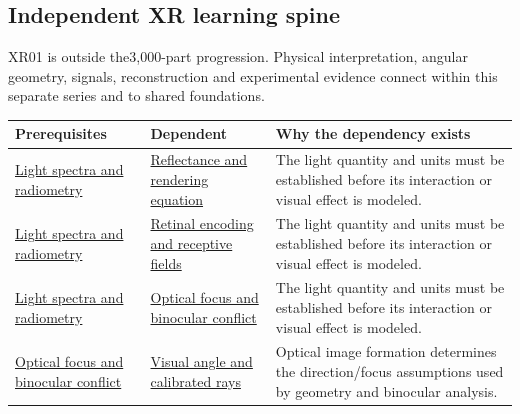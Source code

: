 \subsection{Independent XR learning spine}\label{appendix-4ad47bdd269a-independent-xr-learning-spine}

XR01 is outside the3,000-part progression. Physical interpretation, angular geometry, signals, reconstruction and experimental evidence connect within this separate series and to shared foundations.

{\def\LTcaptype{none} %
\begin{longtable}[]{@{}
  >{\raggedright\arraybackslash}p{}
  >{\raggedright\arraybackslash}p{}
  >{\raggedright\arraybackslash}p{}@{}}
\toprule\noalign{}
\begin{minipage}[b]{\linewidth}\raggedright
Prerequisites
\end{minipage} & \begin{minipage}[b]{\linewidth}\raggedright
Dependent
\end{minipage} & \begin{minipage}[b]{\linewidth}\raggedright
Why the dependency exists
\end{minipage} \\
\midrule\noalign{}
\endhead
\bottomrule\noalign{}
\endlastfoot
\hyperref[appendix-215c2570199b]{Light spectra and radiometry} & \hyperref[appendix-96da0b153b77]{Reflectance and rendering equation} & The light quantity and units must be established before its interaction or visual effect is modeled. \\
\hyperref[appendix-215c2570199b]{Light spectra and radiometry} & \hyperref[appendix-7281c15ac44a]{Retinal encoding and receptive fields} & The light quantity and units must be established before its interaction or visual effect is modeled. \\
\hyperref[appendix-215c2570199b]{Light spectra and radiometry} & \hyperref[appendix-f90cee1be7a4]{Optical focus and binocular conflict} & The light quantity and units must be established before its interaction or visual effect is modeled. \\
\hyperref[appendix-f90cee1be7a4]{Optical focus and binocular conflict} & \hyperref[appendix-7d356c396d1a]{Visual angle and calibrated rays} & Optical image formation determines the direction/focus assumptions used by geometry and binocular analysis. \\

\end{longtable}}
